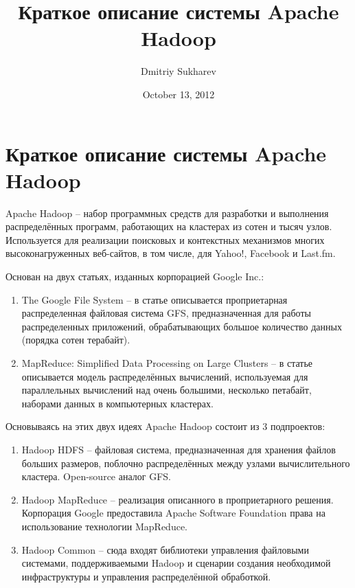 \documentclass[a4paper,11pt]{article}
\author{Dmitriy Sukharev}
\title{Краткое описание системы Apache Hadoop}
\date{October 13, 2012}
\begin{document}
\section{Краткое описание системы Apache Hadoop}
Apache Hadoop -- набор программных средств для разработки и выполнения распределённых программ, работающих на кластерах
из сотен и тысяч узлов. Используется для реализации поисковых и контекстных механизмов многих высоконагруженных
веб-сайтов, в том числе, для Yahoo!, Facebook и Last.fm\cite{fb}\cite{powered-by}.

Основан на двух статьях, изданных корпорацией Google Inc.:
\begin{enumerate}
    \item The Google File System\cite{gfs} -- в статье описывается проприетарная распределенная файловая система GFS,
          предназначенная для работы распределенных приложений, обрабатывающих большое количество данных (порядка сотен
          терабайт).
    \item MapReduce: Simplified Data Processing on Large Clusters\cite{mapreduce} -- в статье описывается модель
          распределённых  вычислений, используемая для параллельных вычислений над очень большими, несколько петабайт,
          наборами данных в компьютерных кластерах.
\end{enumerate}

Основываясь на этих двух идеях Apache Hadoop состоит из 3 подпроектов:
\begin{enumerate}
    \item Hadoop HDFS -- файловая система, предназначенная для хранения файлов больших размеров, поблочно распределённых
          между узлами вычислительного кластера. Open-source аналог GFS.
    \item Hadoop MapReduce -- реализация описанного в \cite{mapreduce} проприетарного решения. Корпорация Google
          предоставила Apache Software Foundation права на использование технологии MapReduce.
    \item Hadoop Common -- сюда входят библиотеки управления файловыми системами, поддерживаемыми Hadoop и сценарии
          создания необходимой инфраструктуры и управления распределённой обработкой.
\end{enumerate}
\end{document}
